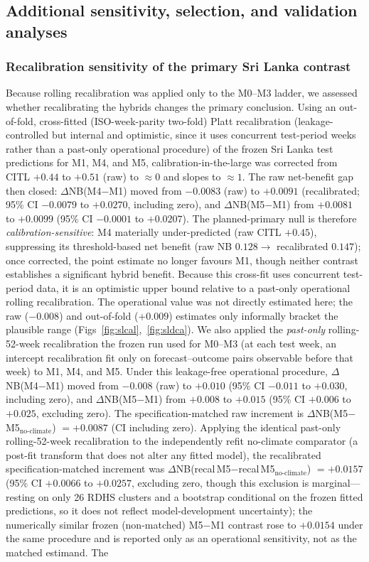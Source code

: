 \documentclass[11pt,a4paper]{article}
\begin{document}
\subsection{Additional sensitivity, selection, and validation analyses}

\subsubsection*{Recalibration sensitivity of the primary Sri Lanka contrast}
Because rolling recalibration was applied only to the M0--M3 ladder, we assessed whether recalibrating the hybrids changes the primary conclusion. Using an out-of-fold, cross-fitted (ISO-week-parity two-fold) Platt recalibration (leakage-controlled but internal and optimistic, since it uses concurrent test-period weeks rather than a past-only operational procedure) of the frozen Sri Lanka test predictions for M1, M4, and M5, calibration-in-the-large was corrected from CITL $+0.44$ to $+0.51$ (raw) to $\approx0$ and slopes to $\approx1$. The raw net-benefit gap then closed: $\Delta$NB(M4$-$M1) moved from $-0.0083$ (raw) to $+0.0091$ (recalibrated; 95\% CI $-0.0079$ to $+0.0270$, including zero), and $\Delta$NB(M5$-$M1) from $+0.0081$ to $+0.0099$ (95\% CI $-0.0001$ to $+0.0207$). The planned-primary null is therefore \emph{calibration-sensitive}: M4 materially under-predicted (raw CITL $+0.45$), suppressing its threshold-based net benefit (raw NB $0.128\to$ recalibrated $0.147$); once corrected, the point estimate no longer favours M1, though neither contrast establishes a significant hybrid benefit. Because this cross-fit uses concurrent test-period data, it is an optimistic upper bound relative to a past-only operational rolling recalibration. The operational value was not directly estimated here; the raw ($-0.008$) and out-of-fold ($+0.009$) estimates only informally bracket the plausible range (Figs~\ref{fig:slcal},~\ref{fig:sldca}). We also applied the \emph{past-only} rolling-52-week recalibration the frozen run used for M0--M3 (at each test week, an intercept recalibration fit only on forecast--outcome pairs observable before that week) to M1, M4, and M5. Under this leakage-free operational procedure, $\Delta$NB(M4$-$M1) moved from $-0.008$ (raw) to $+0.010$ (95\% CI $-0.011$ to $+0.030$, including zero), and $\Delta$NB(M5$-$M1) from $+0.008$ to $+0.015$ (95\% CI $+0.006$ to $+0.025$, excluding zero). The specification-matched raw increment is $\Delta$NB(M5$-$M5$_{\text{no-climate}}$) $=+0.0087$ (CI including zero). Applying the identical past-only rolling-52-week recalibration to the independently refit no-climate comparator (a post-fit transform that does not alter any fitted model), the recalibrated specification-matched increment was $\Delta$NB(recal\,M5$-$recal\,M5$_{\text{no-climate}}$) $=+0.0157$ (95\% CI $+0.0066$ to $+0.0257$, excluding zero, though this exclusion is marginal---resting on only 26 RDHS clusters and a bootstrap conditional on the frozen fitted predictions, so it does not reflect model-development uncertainty); the numerically similar frozen (non-matched) M5$-$M1 contrast rose to $+0.0154$ under the same procedure and is reported only as an operational sensitivity, not as the matched estimand. The 
\end{document}
